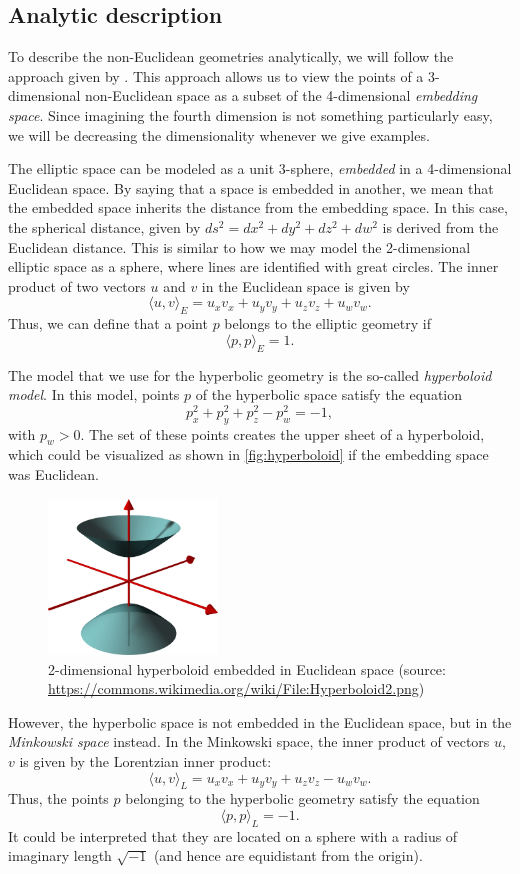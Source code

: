 \subsection{Analytic description}
To describe the non-Euclidean geometries analytically, we will follow the approach given by \cite{Szirmay-Kalos2022}.
This approach allows us to view the points of a 3-dimensional non-Euclidean space as a subset of the 4-dimensional \textit{embedding space}.
Since imagining the fourth dimension is not something particularly easy, we will be decreasing the dimensionality whenever we give examples.

The elliptic space can be modeled as a unit 3-sphere, \textit{embedded} in a 4-dimensional Euclidean space.
By saying that a space is embedded in another, we mean that the embedded space inherits the distance from the embedding space.
In this case, the spherical distance, given by $ds^2 = dx^2 + dy^2 + dz^2 + dw^2$ is derived from the Euclidean distance.
This is similar to how we may model the 2-dimensional elliptic space as a sphere, where lines are identified with great circles.
The inner product of two vectors $u$ and $v$ in the Euclidean space is given by
$$ \langle u, v \rangle_E  = u_xv_x + u_yv_y + u_zv_z + u_wv_w.$$
Thus, we can define that a point $p$ belongs to the elliptic geometry if
$$ \langle p, p \rangle_E = 1.$$

The model that we use for the hyperbolic geometry is the so-called \textit{hyperboloid model}.
In this model, points $p$ of the hyperbolic space satisfy the equation
$$p_x^2 + p_y^2 + p_z^2 - p_w^2 = -1,$$
with $p_w > 0$.
The set of these points creates the upper sheet of a hyperboloid, which could be visualized as shown in \autoref{fig:hyperboloid} if the embedding space was Euclidean.
\begin{figure}[h]
    \centering
    \includegraphics[width=0.4\textwidth]{chapters/theoretical_foundations/sections/non-eudlidean-spaces/resources/hyperboloid.png}
    \caption{2-dimensional hyperboloid embedded in Euclidean space (source: \url{https://commons.wikimedia.org/wiki/File:Hyperboloid2.png})}
    \label{fig:hyperboloid}
\end{figure}
However, the hyperbolic space is not embedded in the Euclidean space, but in the \textit{Minkowski space} instead.
In the Minkowski space, the inner product of vectors $u$, $v$ is given by the Lorentzian inner product:
$$\langle u, v \rangle_L = u_xv_x + u_yv_y + u_zv_z - u_wv_w.$$
Thus, the points $p$ belonging to the hyperbolic geometry satisfy the equation
$$\langle p, p \rangle_L = -1.$$
It could be interpreted that they are located on a sphere with a radius of imaginary length $\sqrt{-1}$ (and hence are equidistant from the origin).

